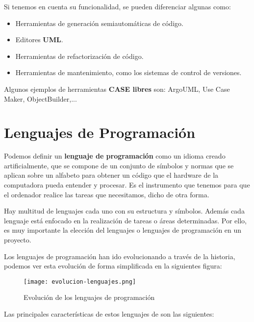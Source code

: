 Si tenemos en cuenta su funcionalidad, se pueden diferenciar algunas como:

\begin{itemize}
    \item Herramientas de generación semiautomáticas de código.
    \item Editores {\bfseries \gls{UML}}.
    \item Herramientas de refactorización de código.
    \item Herramientas de mantenimiento, como los sistemas de control de versiones.
\end{itemize}

Algunos ejemplos de herramientas {\bfseries CASE libres} son: ArgoUML, Use Case Maker, ObjectBuilder,...

\section{Lenguajes de Programación}
Podemos definir un \textbf{lenguaje de programación} como un idioma creado artificialmente, que se compone de un conjunto de símbolos y normas que se aplican sobre un alfabeto para obtener un código que el hardware de la computadora pueda entender y procesar. Es el instrumento que tenemos para que el ordenador realice las tareas que necesitamos, dicho de otra forma.

Hay multitud de lenguajes cada uno con su estructura y símbolos. Además cada lenguaje está enfocado en la realización de tareas o áreas determinadas. Por ello, es muy importante la elección del lenguajes o lenguajes de programación en un proyecto.

Los lenguajes de programación han ido evolucionando a través de la historia, podemos ver esta evolución de forma simplificada en la siguientes figura:

\begin{figure}[ht]
    \centering
    \texttt{[image: evolucion-lenguajes.png]}
    \caption{Evolución de los lenguajes de programación}
\end{figure}

Las principales características de estos lenguajes de son las siguientes:

